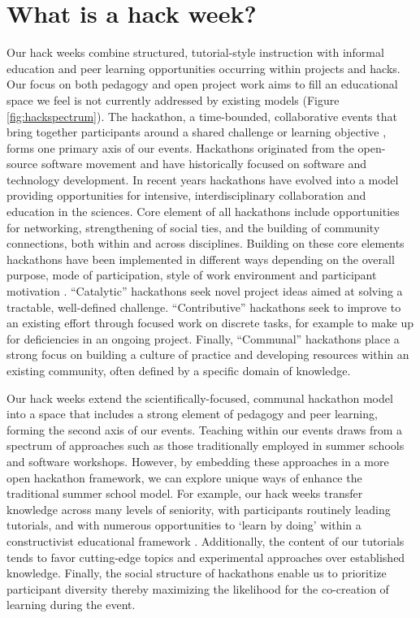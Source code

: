 \section*{What is a hack week?}

Our hack weeks combine structured, tutorial-style instruction with informal education and peer learning opportunities occurring within projects and hacks. 
Our focus on both pedagogy and open project work aims to fill an educational space we feel is not currently addressed by existing models (Figure \ref{fig:hackspectrum}). 
The hackathon, a time-bounded, collaborative events that bring together participants around a shared challenge or learning objective \cite{Decker2015}, forms one primary axis of our events. 
Hackathons originated from the open-source software movement and have historically focused on software and technology development. 
In recent years hackathons have evolved into a model providing opportunities for intensive, interdisciplinary collaboration \cite{Groen2015-cj} and education \cite{Kienzler2015-zu,Lamers2014-xf} in the sciences. 
Core element of all hackathons include opportunities for networking, strengthening of social ties, and the building of community connections, both within and across disciplines.
Building on these core elements hackathons have been implemented in different ways depending on the overall purpose, mode of participation, style of work environment and participant motivation \cite{Drouhard2017}. 
``Catalytic'' hackathons seek novel project ideas aimed at solving a tractable, well-defined challenge.
``Contributive'' hackathons seek to improve to an existing effort through focused work on discrete tasks, for example to make up for deficiencies in an ongoing project.
Finally, ``Communal'' hackathons place a strong focus on building a culture of practice and developing resources within an existing community, often defined by a specific domain of knowledge.

Our hack weeks extend the scientifically-focused, communal hackathon model into a space that includes a strong element of pedagogy and peer learning, forming the second axis of our events. 
Teaching within our events draws from a spectrum of approaches such as those traditionally employed in summer schools and software workshops. 
However, by embedding these approaches in a more open hackathon framework, we can explore unique ways of enhance the traditional summer school model.
For example, our hack weeks transfer knowledge across many levels of seniority, with participants routinely leading tutorials, and with numerous opportunities to `learn by doing' within a constructivist educational framework \cite{Bransford2000-lu}.
Additionally, the content of our tutorials tends to favor cutting-edge topics and experimental approaches over established knowledge. 
Finally, the social structure of hackathons enable us to prioritize participant diversity thereby maximizing the likelihood for the co-creation of learning during the event. 

